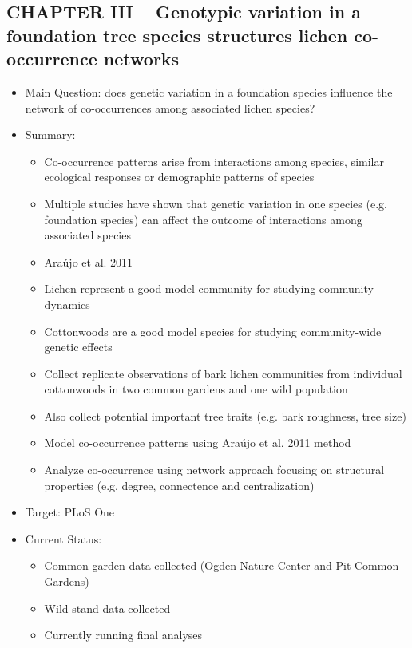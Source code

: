 \documentclass[12pt]{article}
\begin{document}
\subsection{CHAPTER III -- Genotypic variation in a foundation tree species structures
  lichen co-occurrence networks}
\begin{itemize}
\item Main Question: does genetic variation in a foundation species
  influence the network of co-occurrences among associated lichen
  species?
\item Summary:
  \begin{itemize}
  \item Co-occurrence patterns arise from interactions among species,
    similar ecological responses or demographic patterns of species \cite{diamond1975,gotelli2000}
  \item Multiple studies have shown that genetic variation in one
    species (e.g. foundation species) can affect the outcome of
    interactions among associated species \cite{bailey2006,smith2011}
  \item Ara\'ujo et al. 2011 \cite{araujo2011}
  \item Lichen represent a good model community for studying community
    dynamics \cite{lamit2011}
  \item Cottonwoods are a good model species for studying
    community-wide genetic effects \cite{whitham2006}
  \item Collect replicate observations of bark lichen communities from
    individual cottonwoods in two common gardens and one wild population
  \item Also collect potential important tree traits (e.g. bark
    roughness, tree size)
  \item Model co-occurrence patterns using Ara\'ujo et al. 2011 method
  \item Analyze co-occurrence using network approach focusing on
    structural properties (e.g. degree, connectence and centralization)
  \end{itemize}
\item Target: PLoS One
\item Current Status:
  \begin{itemize}
  \item Common garden data collected (Ogden Nature Center and Pit
    Common Gardens)
  \item Wild stand data collected
  \item Currently running final analyses
  \end{itemize}
\end{itemize}
\end{document}
